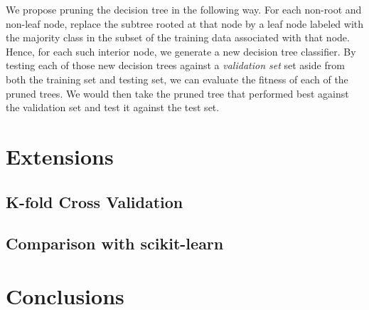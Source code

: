 \documentclass[12pt, conference, compsocconf]{IEEEtran}
\begin{document}
We propose pruning the decision tree in the following way. 
For each non-root and non-leaf node, replace the subtree rooted at that node by a leaf node labeled with the majority class in the subset of the training data associated with that node. 
Hence, for each such interior node, we generate a new decision tree classifier.
By testing each of those new decision trees against a \emph{validation set} set aside from both the training set and testing set, we can evaluate the fitness of each of the pruned trees. 
We would then take the pruned tree that performed best against the validation set and test it against the test set. 

\section{Extensions}

\subsection{K-fold Cross Validation}

\subsection{Comparison with scikit-learn}

\section{Conclusions}

%
%
\end{document}

